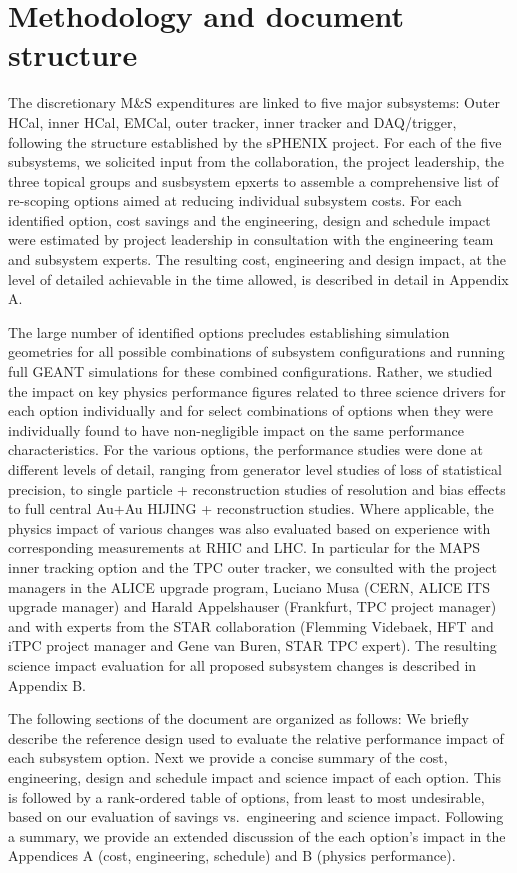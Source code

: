 \section{Methodology and document structure}

The discretionary M\&S expenditures are linked to five major subsystems: Outer HCal, inner HCal, EMCal, outer tracker, inner tracker and DAQ/trigger, 
following the structure established by the sPHENIX project. For each of the five subsystems, we solicited input from the collaboration, the 
project leadership, the three topical groups and susbsystem epxerts to assemble a comprehensive list of re-scoping options aimed at reducing 
individual subsystem costs. For each identified option, cost savings and the engineering, design and schedule impact were estimated by project 
leadership in consultation with the engineering team and subsystem experts. The resulting cost, engineering and design impact, at the 
level of detailed achievable in the time allowed, is described in detail in Appendix A.

The large number of identified options precludes establishing simulation geometries for all possible combinations of subsystem configurations
and running full GEANT simulations for these combined configurations. Rather, we studied the impact on key physics performance figures
related to three science drivers for each option individually and for select combinations of options when they were individually found to
have non-negligible impact on the same performance characteristics. For the various options, the performance studies were done at different 
levels of detail, ranging from generator level studies of loss of statistical precision, to single particle \geant + reconstruction studies 
of resolution and bias effects to full central Au+Au HIJING \geant + reconstruction studies. Where applicable, the physics impact of various
changes was also evaluated based on experience with corresponding measurements at RHIC and LHC. In particular for the MAPS inner tracking 
option and the TPC outer tracker, we consulted with the project managers in the ALICE upgrade program, Luciano Musa (CERN, ALICE ITS upgrade 
manager) and Harald Appelshauser (Frankfurt, TPC project manager) and with experts from the STAR collaboration (Flemming Videbaek, HFT and
iTPC project manager and Gene van Buren, STAR TPC expert). The resulting science impact evaluation for all proposed subsystem changes 
is described in Appendix B.

The following sections of the document are organized as follows: We briefly describe the reference design used to evaluate the relative
performance impact of each subsystem option. Next we provide a concise summary of the cost, engineering, design and schedule impact and 
science impact of each option. This is followed by a rank-ordered table of options, from least to most undesirable, based on our 
evaluation of savings vs.\ engineering and science impact. Following a summary, we provide an extended discussion of the each option's impact
in the Appendices A (cost, engineering, schedule) and B (physics performance).



